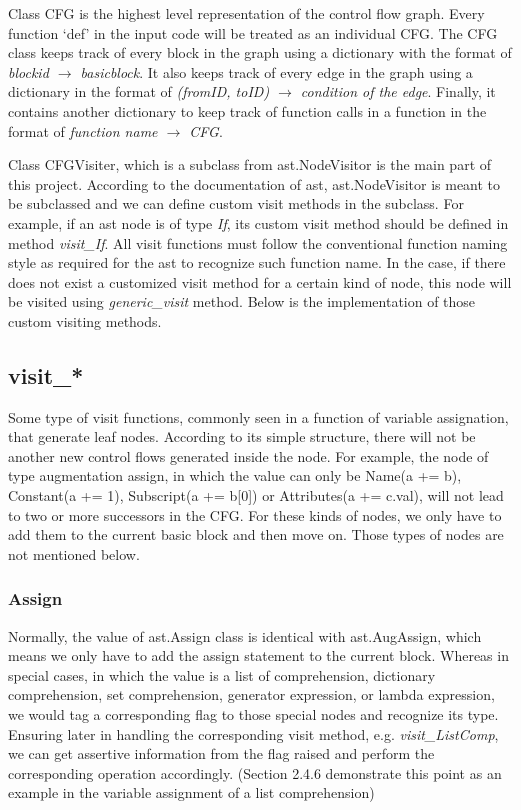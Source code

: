 \documentclass[11pt]{article}
\begin{document}
Class CFG is the highest level representation of the control flow graph. Every function `def' in the input code will be treated as an individual CFG. The CFG class keeps track of every block in the graph using a dictionary with the format of \textit{blockid $\rightarrow$ basicblock}. It also keeps track of every edge in the graph using a dictionary in the format of \textit{(fromID, toID) $\rightarrow$ condition of the edge}. Finally, it contains another dictionary to keep track of function calls in a function in the format of \textit{function name $\rightarrow$ CFG}.

Class CFGVisiter, which is a subclass from ast.NodeVisitor is the main part of this project. According to the documentation of ast, ast.NodeVisitor is meant to be subclassed and we can define custom visit methods in the subclass. For example, if an ast node is of type \textit{If}, its custom visit method should be defined in method \textit{visit\_If}. All visit functions must follow the conventional function naming style as required for the ast to recognize such function name. In the case, if there does not exist a customized visit method for a certain kind of node, this node will be visited using \textit{generic\_visit} method. Below is the implementation of those custom visiting methods.

\subsection{visit\_*}
Some type of visit functions, commonly seen in a function of variable assignation, that generate leaf nodes. According to its simple structure, there will not be another new control flows generated inside the node. For example, the node of type augmentation assign, in which the value can only be Name(a += b), Constant(a += 1), Subscript(a += b[0]) or Attributes(a += c.val), will not lead to two or more successors in the CFG. For these kinds of nodes, we only have to add them to the current basic block and then move on. Those types of nodes are not mentioned below.

\subsubsection{Assign}
Normally, the value of ast.Assign class is identical with ast.AugAssign, which means we only have to add the assign statement to the current block. Whereas in special cases, in which the value is a list of comprehension, dictionary comprehension, set comprehension, generator expression, or lambda expression, we would tag a corresponding flag to those special nodes and recognize its type. Ensuring later in handling the corresponding visit method, e.g. \textit{visit\_ListComp}, we can get assertive information from the flag raised and perform the corresponding operation accordingly. (Section 2.4.6 demonstrate this point as an example in the variable assignment of a list comprehension)
\end{document}
